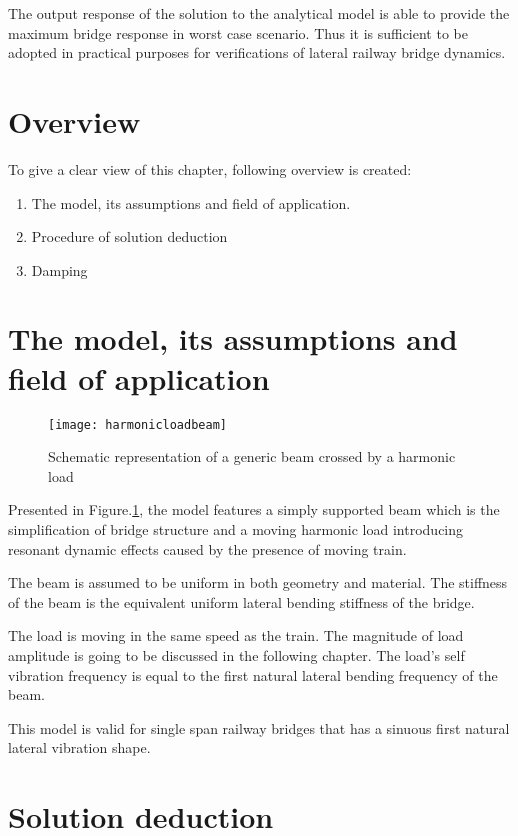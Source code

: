 The output response of the solution to the analytical model is able to provide the maximum bridge response in worst case scenario. Thus it is sufficient to be adopted in practical purposes for verifications of lateral railway bridge dynamics.


\section{Overview}

To give a clear view of this chapter, following overview is created:

\begin{enumerate}
    \item The model, its assumptions and field of application. 
    \item Procedure of solution deduction
    \item Damping
\end{enumerate}

\section{The model, its assumptions and field of application}

\begin{figure}[h]
    \centering
    \texttt{[image: harmonicloadbeam]}
    \caption{Schematic representation of a generic beam crossed by a harmonic load}
    \label{fig:harmonicloadbeam}
\end{figure}

Presented in Figure.\ref{fig:harmonicloadbeam}, the model features a simply supported beam which is the simplification of bridge structure and a moving harmonic load introducing resonant dynamic effects caused by the presence of moving train.

The beam is assumed to be uniform in both geometry and material. The stiffness of the beam is the equivalent uniform lateral bending stiffness of the bridge. 

The load is moving in the same speed as the train. The magnitude of load amplitude is going to be discussed in the following chapter. The load's self vibration frequency is equal to the first natural lateral bending frequency of the beam.


This model is valid for single span railway bridges that has a sinuous first natural lateral vibration shape.  

\section{Solution deduction}

